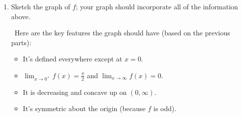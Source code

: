 \documentclass{article}
\begin{document}
\begin{enumerate}
\begin{enumerate}
    \begin{solution}
      As $x \to \infty$, $\frac{1}{x} \to 0$, so $\boxed{\lim_{x \to
          \infty} \arctan \left( \frac{1}{x} \right) = 0}$ (if this is
      confusing, imagine plugging a huge positive number in for $x$:
      $\arctan \left( \frac{1}{x} \right)$ will involve taking $\arctan$
      of a tiny positive number, which gives a result close to 0).

      We can reason the same way about $\displaystyle \lim_{x \to -\infty}
      f(x)$, or we can use the fact that $f$ is odd to conclude that
      $\boxed{\displaystyle \lim_{x \to -\infty} f(x) = - \lim_{x \to
          \infty} f(x) = 0}$ as well.

      So, there is . 
    \end{solution}

  \item
    \begin{problem}[\stretch{2}]
      Sketch the graph of $f$; your graph should incorporate all of the
      information above. 
    \end{problem}

    \begin{solution} %
      \begin{center}
      \end{center}
      \checkmark\ 
        Here are the key features the graph should have (based on the
        previous parts):
        \begin{itemize}[nosep]
        \item It's defined everywhere except at $x = 0$.
        \item $\displaystyle \lim_{x \to 0^+} f(x) = \frac{\pi}{2}$ and
          $\displaystyle \lim_{x \to \infty} f(x) = 0$.
        \item It is decreasing and concave up on $(0, \infty)$.
        \item It's symmetric about the origin (because $f$ is odd).
        \end{itemize}
    \end{solution}


\end{enumerate}
\end{enumerate}
\end{document}
